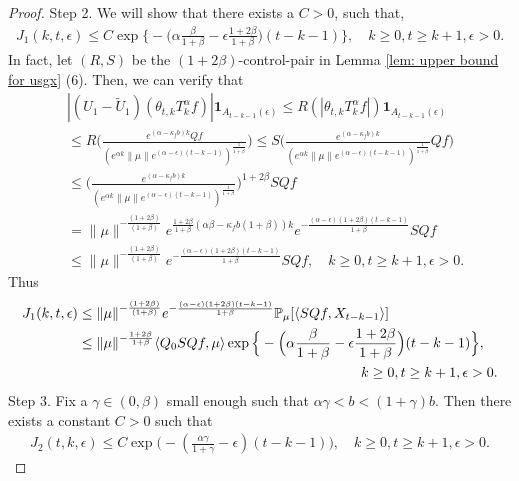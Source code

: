 \documentclass[12pt]{amsart}
\theoremstyle{plain}
\theoremstyle{definition}
\numberwithin{equation}{section}
\begin{document}
\begin{proof}
Step 2.  We will show that there exists a $C>0$, such that,
    \begin{align}
    \label{lemma31q}
      J_1(k,t,\epsilon)\leq C\exp\Big\{-\Big(\alpha\frac{\beta}{1+\beta}-\epsilon\frac{1+2\beta}{1+\beta}\Big)(t-k-1)\Big\},
      \quad k \geq 0, t\geq k+1, \epsilon > 0.
    \end{align}
	In fact, let $(R,S)$ be the $(1+2\beta)$-control-pair in Lemma \ref{lem: upper bound for usgx} (6).
	Then, we can verify that
\begin{align}
   & |(U_1 - \tilde U_1)(\theta_{t,k}T_k^{\alpha}f)|\mathbf{1}_{A_{t-k-1}(\epsilon)}
   \leq R(|\theta_{t,k}T_k^{\alpha}f|)\mathbf{1}_{A_{t-k-1}(\epsilon)}
   \\&\leq R \Big(\frac{e^{(\alpha-\kappa_fb)k} Qf}{(e^{\alpha k}\|\mu\|e^{(\alpha-\epsilon)(t-k-1)})^\frac{1}{1+\beta}}\Big)
    \leq S \Big(\frac{e^{(\alpha-\kappa_fb)k}}{(e^{\alpha k}\|\mu\|e^{(\alpha-\epsilon)(t-k-1)})^\frac{1}{1+\beta}}Qf\Big)
   \\&\leq \Big(\frac{e^{(\alpha-\kappa_fb)k}}{(e^{\alpha k}\|\mu\|e^{(\alpha-\epsilon)(t-k-1)})^\frac{1}{1+\beta}}\Big)^{1+2\beta}SQf
   \\&=\|\mu\|^{-\frac{(1+2\beta)}{(1+\beta)}}e^{\frac{1+2\beta}{1+\beta}(\alpha\beta-\kappa_fb(1+\beta))k}e^{-\frac{(\alpha-\epsilon)(1+2\beta)(t-k-1)}{1+\beta}}SQf
   \\&\leq\|\mu\|^{-\frac{(1+2\beta)}{(1+\beta)}} e^{-\frac{(\alpha-\epsilon)(1+2\beta)(t-k-1)}{1+\beta}}SQf,
   \quad k\geq 0, t\geq k+1, \epsilon > 0.
\end{align}
Thus
\begin{align}
\label{eq: estimate of J1}
     J_1(k,t,\epsilon)&
     \leq \|\mu\|^{-\frac{(1+2\beta)}{(1+\beta)}} e^{-\frac{(\alpha-\epsilon)(1+2\beta)(t-k-1)}{1+\beta}}\mathbb{P}_{\mu}[\langle SQf,X_{t-k-1}\rangle]\\
     & \leq \|\mu\|^{-\frac{1+2\beta}{1+\beta}} \langle Q_0 SQf, \mu \rangle \exp\Big\{-\Big(\alpha\frac{\beta}{1+\beta}-\epsilon\frac{1+2\beta}{1+\beta}\Big)(t-k-1)\Big\},
     \\ &&\mathllap {k\geq 0, t\geq k+1, \epsilon > 0.}
\end{align}
	Step 3.
	Fix a $\gamma\in(0,\beta)$ small enough such that $\alpha \gamma < b < (1+\gamma)b$.
	Then there exists a constant $C > 0$ such that
\begin{align}
\label{eq:31step3}
    J_2(t,k,\epsilon)
    \leq C \exp\Big(-(\frac{\alpha\gamma}{1+\gamma}-\epsilon)(t-k-1)\Big),
    \quad k\geq 0, t\geq k+1, \epsilon >0.

\end{align}
\end{proof}
\end{document}
